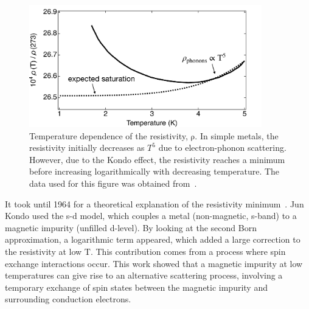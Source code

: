\begin{figure}[!hbt]
 \begin{center}
\includegraphics[width=0.9\textwidth]{figures/ch2/figure9.pdf}
\caption[Kondo Effect in Bulk Materials]{\label{fig:ch2/kondo_bulkmetal} 
Temperature dependence of the resistivity, $\mathrm{\rho}$. In simple metals, the resistivity initially decreases as $T^5$ due to electron-phonon scattering. However, due to the Kondo effect, the resistivity reaches a minimum before increasing logarithmically with decreasing temperature. The data used for this figure was obtained from~\cite{de_haas}.
 }
 \end{center}
\end{figure}




It took until 1964 for a theoretical explanation of the resistivity minimum~\cite{jun_kondo}. Jun Kondo used the s-d model, which couples a metal (non-magnetic, s-band) to a magnetic impurity (unfilled d-level). By looking at the second Born approximation, a logarithmic term appeared, which added a large correction to the resistivity at low $\mathrm{T}$. This contribution comes from a process where spin exchange interactions occur. This work showed that a magnetic impurity at low temperatures can give rise to an alternative scattering process, involving a temporary exchange of spin states between the magnetic impurity and surrounding conduction electrons. 

